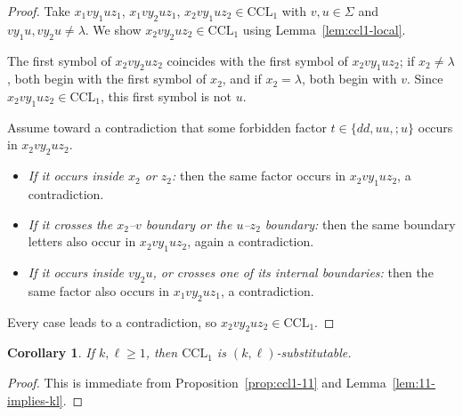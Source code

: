 \documentclass[11pt,a4paper]{article}
\newtheorem{corollary}[theorem]{Corollary}
\begin{document}
\begin{proof}
Take $x_1vy_1uz_1$, $x_1vy_2uz_1$, $x_2vy_1uz_2\in\mathrm{CCL}_1$ with $v,u\in\Sigma$ and $vy_1u,vy_2u\ne\lambda$. We show $x_2vy_2uz_2\in\mathrm{CCL}_1$ using Lemma~\ref{lem:ccl1-local}.

The first symbol of $x_2vy_2uz_2$ coincides with the first symbol of $x_2vy_1uz_2$; if $x_2\ne\lambda$, both begin with the first symbol of $x_2$, and if $x_2=\lambda$, both begin with $v$. Since $x_2vy_1uz_2\in\mathrm{CCL}_1$, this first symbol is not $u$.

Assume toward a contradiction that some forbidden factor $t\in\{dd,uu,;u\}$ occurs in $x_2vy_2uz_2$.
\begin{itemize}[nosep]
  \item \emph{If it occurs inside $x_2$ or $z_2$:} then the same factor occurs in $x_2vy_1uz_2$, a contradiction.
  \item \emph{If it crosses the $x_2$--$v$ boundary or the $u$--$z_2$ boundary:} then the same boundary letters also occur in $x_2vy_1uz_2$, again a contradiction.
  \item \emph{If it occurs inside $vy_2u$, or crosses one of its internal boundaries:} then the same factor also occurs in $x_1vy_2uz_1$, a contradiction.
\end{itemize}
Every case leads to a contradiction, so $x_2vy_2uz_2\in\mathrm{CCL}_1$.
\end{proof}

\begin{corollary}\label{cor:ccl1-positive}
If $k,\ell\ge1$, then $\mathrm{CCL}_1$ is $(k,\ell)$-substitutable.
\end{corollary}

\begin{proof}
This is immediate from Proposition~\ref{prop:ccl1-11} and Lemma~\ref{lem:11-implies-kl}.
\end{proof}
\end{document}
